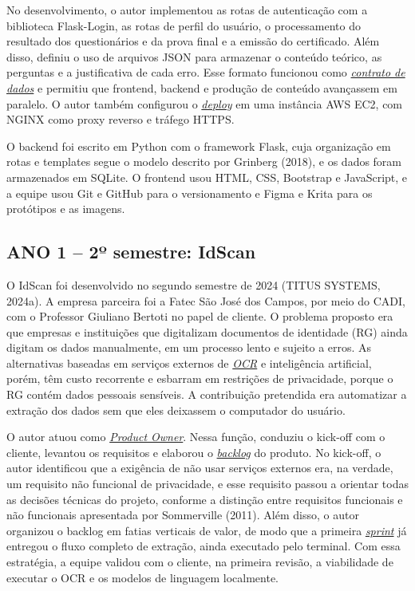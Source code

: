 \documentclass[12pt,a4paper]{article}
\newcommand{\termo}[2]{\hyperlink{gls:#1}{\textit{#2}}}
\begin{document}
No desenvolvimento, o autor implementou as rotas de autenticação com a biblioteca Flask-Login, as rotas de perfil do usuário, o processamento do resultado dos questionários e da prova final e a emissão do certificado. Além disso, definiu o uso de arquivos JSON para armazenar o conteúdo teórico, as perguntas e a justificativa de cada erro. Esse formato funcionou como \termo{contrato}{contrato de dados} e permitiu que frontend, backend e produção de conteúdo avançassem em paralelo. O autor também configurou o \termo{deploy}{deploy} em uma instância AWS EC2, com NGINX como proxy reverso e tráfego HTTPS.

O backend foi escrito em Python com o framework Flask, cuja organização em rotas e templates segue o modelo descrito por Grinberg (2018), e os dados foram armazenados em SQLite. O frontend usou HTML, CSS, Bootstrap e JavaScript, e a equipe usou Git e GitHub para o versionamento e Figma e Krita para os protótipos e as imagens.

\subsection{ANO 1 – 2º semestre: IdScan}

O IdScan foi desenvolvido no segundo semestre de 2024 (TITUS SYSTEMS, 2024a). A empresa parceira foi a Fatec São José dos Campos, por meio do CADI, com o Professor Giuliano Bertoti no papel de cliente. O problema proposto era que empresas e instituições que digitalizam documentos de identidade (RG) ainda digitam os dados manualmente, em um processo lento e sujeito a erros. As alternativas baseadas em serviços externos de \termo{ocr}{OCR} e inteligência artificial, porém, têm custo recorrente e esbarram em restrições de privacidade, porque o RG contém dados pessoais sensíveis. A contribuição pretendida era automatizar a extração dos dados sem que eles deixassem o computador do usuário.

O autor atuou como \termo{po}{Product Owner}. Nessa função, conduziu o kick-off com o cliente, levantou os requisitos e elaborou o \termo{backlog}{backlog} do produto. No kick-off, o autor identificou que a exigência de não usar serviços externos era, na verdade, um requisito não funcional de privacidade, e esse requisito passou a orientar todas as decisões técnicas do projeto, conforme a distinção entre requisitos funcionais e não funcionais apresentada por Sommerville (2011). Além disso, o autor organizou o backlog em fatias verticais de valor, de modo que a primeira \termo{sprint}{sprint} já entregou o fluxo completo de extração, ainda executado pelo terminal. Com essa estratégia, a equipe validou com o cliente, na primeira revisão, a viabilidade de executar o OCR e os modelos de linguagem localmente.
\end{document}
